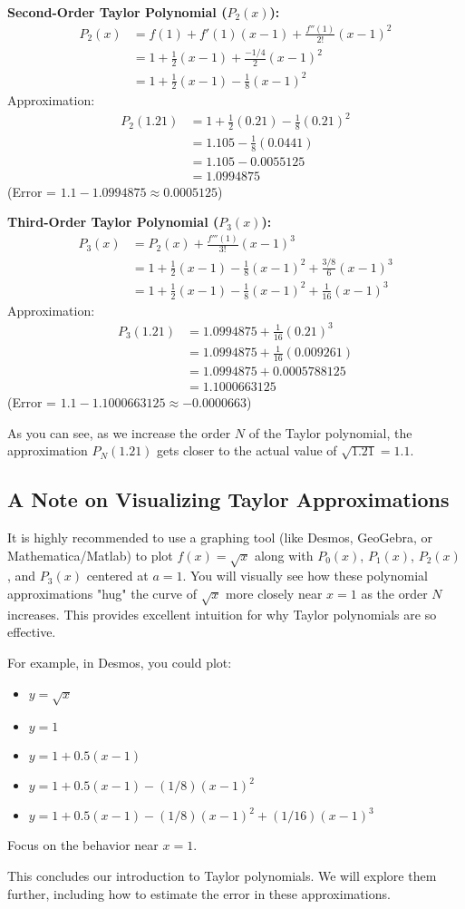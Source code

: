 \documentclass[11pt, a4paper]{article}
\theoremstyle{plain}
\theoremstyle{definition}
\theoremstyle{remark}
\begin{document}
\textbf{Second-Order Taylor Polynomial ($P_2(x)$):}
\begin{align*} P_2(x) &= f(1) + f'(1)(x-1) + \frac{f''(1)}{2!}(x-1)^2 \\ &= 1 + \frac{1}{2}(x-1) + \frac{-1/4}{2}(x-1)^2 \\ &= 1 + \frac{1}{2}(x-1) - \frac{1}{8}(x-1)^2 \end{align*}
Approximation:
\begin{align*} P_2(1.21) &= 1 + \frac{1}{2}(0.21) - \frac{1}{8}(0.21)^2 \\ &= 1.105 - \frac{1}{8}(0.0441) \\ &= 1.105 - 0.0055125 \\ &= 1.0994875 \end{align*}
(Error = $1.1 - 1.0994875 \approx 0.0005125$)

\textbf{Third-Order Taylor Polynomial ($P_3(x)$):}
\begin{align*} P_3(x) &= P_2(x) + \frac{f'''(1)}{3!}(x-1)^3 \\ &= 1 + \frac{1}{2}(x-1) - \frac{1}{8}(x-1)^2 + \frac{3/8}{6}(x-1)^3 \\ &= 1 + \frac{1}{2}(x-1) - \frac{1}{8}(x-1)^2 + \frac{1}{16}(x-1)^3 \end{align*}
Approximation:
\begin{align*} P_3(1.21) &= 1.0994875 + \frac{1}{16}(0.21)^3 \\ &= 1.0994875 + \frac{1}{16}(0.009261) \\ &= 1.0994875 + 0.0005788125 \\ &= 1.1000663125 \end{align*}
(Error = $1.1 - 1.1000663125 \approx -0.0000663$)

As you can see, as we increase the order $N$ of the Taylor polynomial, the approximation $P_N(1.21)$ gets closer to the actual value of $\sqrt{1.21}=1.1$.

\subsection{A Note on Visualizing Taylor Approximations}
It is highly recommended to use a graphing tool (like Desmos, GeoGebra, or Mathematica/Matlab) to plot $f(x) = \sqrt{x}$ along with $P_0(x)$, $P_1(x)$, $P_2(x)$, and $P_3(x)$ centered at $a=1$. You will visually see how these polynomial approximations "hug" the curve of $\sqrt{x}$ more closely near $x=1$ as the order $N$ increases. This provides excellent intuition for why Taylor polynomials are so effective.

For example, in Desmos, you could plot:
\begin{itemize}
    \item $y=\sqrt{x}$
    \item $y=1$
    \item $y=1 + 0.5(x-1)$
    \item $y=1 + 0.5(x-1) - (1/8)(x-1)^2$
    \item $y=1 + 0.5(x-1) - (1/8)(x-1)^2 + (1/16)(x-1)^3$
\end{itemize}
Focus on the behavior near $x=1$.

This concludes our introduction to Taylor polynomials. We will explore them further, including how to estimate the error in these approximations.
\end{document}
